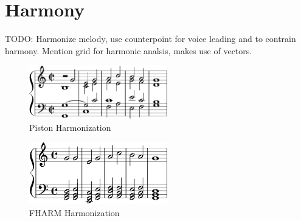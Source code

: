\newcommand{\piston}{
  \begin{figure}
    \includegraphics[width=6cm]{fig/piston1.png}
    \caption{Piston Harmonization}
    \label{fig:piston}
  \end{figure}
}

\newcommand{\fharm}{
  \begin{figure}
    \includegraphics[width=6cm]{fig/piston2.png}
    \caption{FHARM Harmonization}
    \label{fig:fharm}
  \end{figure}
}

\section{Harmony}
\label{sec:harmony}

TODO: Harmonize melody, use counterpoint for voice leading and to contrain harmony.
Mention grid for harmonic analsis, makes use of vectors.

\piston

\fharm
